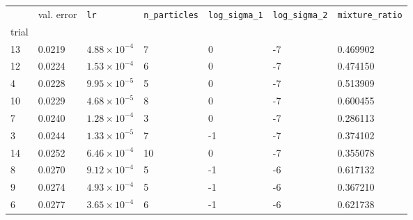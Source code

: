 \begin{tabular}{lp{2cm}p{2cm}p{2cm}p{2cm}p{2cm}p{2cm}}
\toprule
{} &  val. error &         \texttt{lr} &  \texttt{n\_particles} &  \texttt{log\_sigma\_1} &  \texttt{log\_sigma\_2} &  \texttt{mixture\_ratio} \\
trial &             &                     &                        &                         &                         &                          \\
\midrule
13    &      0.0219 & $4.88\times10^{-4}$ &                      7 &                       0 &                      -7 &                 0.469902 \\
12    &      0.0224 & $1.53\times10^{-4}$ &                      6 &                       0 &                      -7 &                 0.474150 \\
4     &      0.0228 & $9.95\times10^{-5}$ &                      5 &                       0 &                      -7 &                 0.513909 \\
10    &      0.0229 & $4.68\times10^{-5}$ &                      8 &                       0 &                      -7 &                 0.600455 \\
7     &      0.0240 & $1.28\times10^{-4}$ &                      3 &                       0 &                      -7 &                 0.286113 \\
3     &      0.0244 & $1.33\times10^{-5}$ &                      7 &                      -1 &                      -7 &                 0.374102 \\
14    &      0.0252 & $6.46\times10^{-4}$ &                     10 &                       0 &                      -7 &                 0.355078 \\
8     &      0.0270 & $9.12\times10^{-4}$ &                      5 &                      -1 &                      -6 &                 0.617132 \\
9     &      0.0274 & $4.93\times10^{-4}$ &                      5 &                      -1 &                      -6 &                 0.367210 \\
6     &      0.0277 & $3.65\times10^{-4}$ &                      6 &                      -1 &                      -6 &                 0.621738 \\
\bottomrule
\end{tabular}
